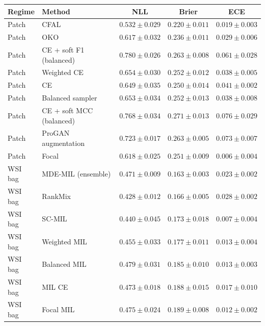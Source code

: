 \begin{tabular}{llccc}
\toprule
Regime & Method & NLL & Brier & ECE\\
\midrule
Patch & CFAL & $\num{0.532} \pm \num{0.029}$ & $\num{0.220} \pm \num{0.011}$ & $\num{0.019} \pm \num{0.003}$\\
Patch & OKO & $\num{0.617} \pm \num{0.032}$ & $\num{0.236} \pm \num{0.011}$ & $\num{0.029} \pm \num{0.006}$\\
Patch & CE + soft F1 (balanced) & $\num{0.780} \pm \num{0.026}$ & $\num{0.263} \pm \num{0.008}$ & $\num{0.061} \pm \num{0.028}$\\
Patch & Weighted CE & $\num{0.654} \pm \num{0.030}$ & $\num{0.252} \pm \num{0.012}$ & $\num{0.038} \pm \num{0.005}$\\
Patch & CE & $\num{0.649} \pm \num{0.035}$ & $\num{0.250} \pm \num{0.014}$ & $\num{0.041} \pm \num{0.002}$\\
Patch & Balanced sampler & $\num{0.653} \pm \num{0.034}$ & $\num{0.252} \pm \num{0.013}$ & $\num{0.038} \pm \num{0.008}$\\
Patch & CE + soft MCC (balanced) & $\num{0.768} \pm \num{0.034}$ & $\num{0.271} \pm \num{0.013}$ & $\num{0.076} \pm \num{0.029}$\\
Patch & ProGAN augmentation & $\num{0.723} \pm \num{0.017}$ & $\num{0.263} \pm \num{0.005}$ & $\num{0.073} \pm \num{0.007}$\\
Patch & Focal & $\num{0.618} \pm \num{0.025}$ & $\num{0.251} \pm \num{0.009}$ & $\num{0.006} \pm \num{0.004}$\\
\addlinespace
WSI bag & MDE-MIL (ensemble) & $\num{0.471} \pm \num{0.009}$ & $\num{0.163} \pm \num{0.003}$ & $\num{0.023} \pm \num{0.002}$\\
WSI bag & RankMix & $\num{0.428} \pm \num{0.012}$ & $\num{0.166} \pm \num{0.005}$ & $\num{0.028} \pm \num{0.002}$\\
WSI bag & SC-MIL & $\num{0.440} \pm \num{0.045}$ & $\num{0.173} \pm \num{0.018}$ & $\num{0.007} \pm \num{0.004}$\\
WSI bag & Weighted MIL & $\num{0.455} \pm \num{0.033}$ & $\num{0.177} \pm \num{0.011}$ & $\num{0.013} \pm \num{0.004}$\\
WSI bag & Balanced MIL & $\num{0.479} \pm \num{0.031}$ & $\num{0.185} \pm \num{0.010}$ & $\num{0.013} \pm \num{0.003}$\\
WSI bag & MIL CE & $\num{0.473} \pm \num{0.018}$ & $\num{0.188} \pm \num{0.015}$ & $\num{0.017} \pm \num{0.010}$\\
WSI bag & Focal MIL & $\num{0.475} \pm \num{0.024}$ & $\num{0.189} \pm \num{0.008}$ & $\num{0.012} \pm \num{0.002}$\\
\bottomrule
\end{tabular}
